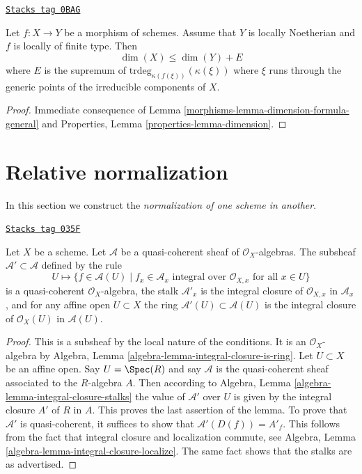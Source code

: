 \begin{lemma}
\label{morphisms-lemma-alteration-dimension-general}
\href{https://stacks.math.columbia.edu/tag/0BAG}{\texttt{Stacks tag 0BAG}}

Let $f : X \to Y$ be a morphism of schemes. Assume that
$Y$ is locally Noetherian and $f$ is locally of finite type.
Then
$$
\dim(X) \leq \dim(Y) + E
$$
where $E$ is the supremum of $\text{trdeg}_{\kappa(f(\xi))}(\kappa(\xi))$
where $\xi$ runs through the generic points of the irreducible components
of $X$.
\end{lemma}

\begin{proof}

Immediate consequence of Lemma \ref{morphisms-lemma-dimension-formula-general}
and Properties, Lemma \ref{properties-lemma-dimension}.
\end{proof}

\section{Relative normalization}
\label{morphisms-section-normalization-X-in-Y}
In this section we construct the {\it normalization of one scheme in another}.

\begin{lemma}
\label{morphisms-lemma-integral-closure}
\href{https://stacks.math.columbia.edu/tag/035F}{\texttt{Stacks tag 035F}}

Let $X$ be a scheme. Let $\mathcal{A}$ be a quasi-coherent sheaf
of $\mathcal{O}_X$-algebras. The subsheaf $\mathcal{A}' \subset \mathcal{A}$
defined by the rule
$$
U \longmapsto \{f \in \mathcal{A}(U) \mid
f_x \in \mathcal{A}_x \text{ integral over } \mathcal{O}_{X, x}
\text{ for all }x \in U\}
$$
is a quasi-coherent $\mathcal{O}_X$-algebra, the stalk $\mathcal{A}'_x$
is the integral closure of $\mathcal{O}_{X, x}$ in $\mathcal{A}_x$, and
for any affine open $U \subset X$ the ring
$\mathcal{A}'(U) \subset \mathcal{A}(U)$ is
the integral closure of $\mathcal{O}_X(U)$ in $\mathcal{A}(U)$.
\end{lemma}

\begin{proof}
This is a subsheaf by the local nature of the conditions.
It is an $\mathcal{O}_X$-algebra by
Algebra, Lemma \ref{algebra-lemma-integral-closure-is-ring}.
Let $U \subset X$ be an affine open. Say $U = \Spec(R)$
and say $\mathcal{A}$ is the quasi-coherent sheaf associated to
the $R$-algebra $A$. Then according to
Algebra, Lemma \ref{algebra-lemma-integral-closure-stalks}
the value of $\mathcal{A}'$ over $U$ is given by the integral
closure $A'$ of $R$ in $A$. This proves the last assertion of
the lemma. To prove that $\mathcal{A}'$ is quasi-coherent, it
suffices to show that $\mathcal{A}'(D(f)) = A'_f$. This follows
from the fact that integral closure and localization commute, see
Algebra, Lemma \ref{algebra-lemma-integral-closure-localize}.
The same fact shows that the stalks are as advertised.
\end{proof}


